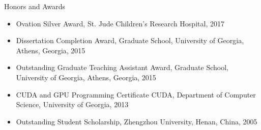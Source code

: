 \documentclass{resume} %
\begin{document}

\begin{rSection}{Honors and Awards}
\begin{itemize}
\item Ovation Silver Award, St. Jude Children’s Research Hospital, 2017
\item Dissertation Completion Award, Graduate School, University of Georgia, Athens, Georgia, 2015
\item Outstanding Graduate Teaching Assistant Award,  Graduate School, University of Georgia, Athens, Georgia, 2015
\item CUDA and GPU Programming Certificate CUDA, Department of Computer Science, University of Georgia, 2013
\item Outstanding Student Scholarship, Zhengzhou University, Henan, China, 2005
\end{itemize}
\end{rSection}
\end{document}
